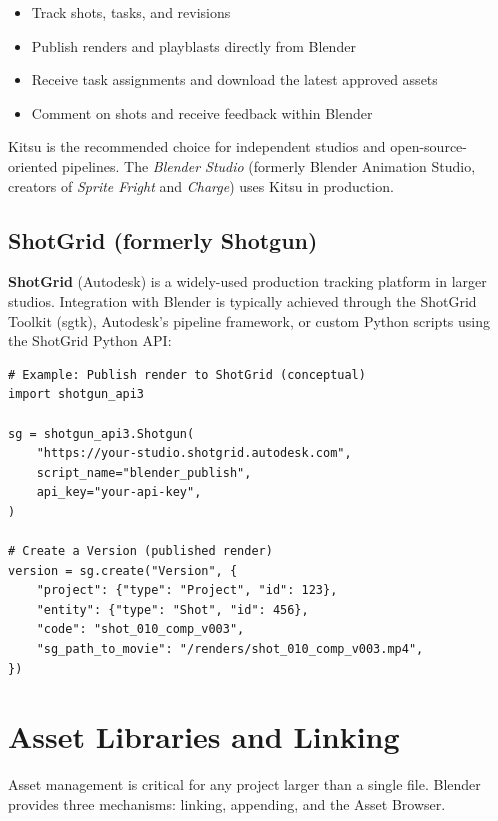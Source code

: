 \begin{itemize}[leftmargin=2em]
  \item Track shots, tasks, and revisions
  \item Publish renders and playblasts directly from Blender
  \item Receive task assignments and download the latest approved assets
  \item Comment on shots and receive feedback within Blender
\end{itemize}

Kitsu is the recommended choice for independent studios and open-source-oriented pipelines. The \textit{Blender Studio} (formerly Blender Animation Studio, creators of \textit{Sprite Fright} and \textit{Charge}) uses Kitsu in production.

\subsection{ShotGrid (formerly Shotgun)}

\textbf{ShotGrid} (Autodesk) is a widely-used production tracking platform in larger studios. Integration with Blender is typically achieved through the ShotGrid Toolkit (sgtk), Autodesk's pipeline framework, or custom Python scripts using the ShotGrid Python API:

\begin{lstlisting}
# Example: Publish render to ShotGrid (conceptual)
import shotgun_api3

sg = shotgun_api3.Shotgun(
    "https://your-studio.shotgrid.autodesk.com",
    script_name="blender_publish",
    api_key="your-api-key",
)

# Create a Version (published render)
version = sg.create("Version", {
    "project": {"type": "Project", "id": 123},
    "entity": {"type": "Shot", "id": 456},
    "code": "shot_010_comp_v003",
    "sg_path_to_movie": "/renders/shot_010_comp_v003.mp4",
})
\end{lstlisting}


\section{Asset Libraries and Linking}
\label{sec:scripting-assets}

Asset management is critical for any project larger than a single file. Blender provides three mechanisms: linking, appending, and the Asset Browser.


